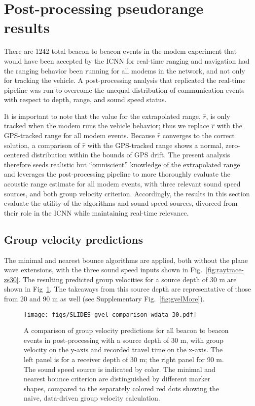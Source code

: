 \FloatBarrier
\section{\label{sec:postprocess} Post-processing pseudorange results}

There are 1242 total beacon to beacon events in the modem experiment that would have been accepted by the ICNN for real-time ranging and navigation had the ranging behavior been running for all modems in the network, and not only for tracking the vehicle.
A post-processing analysis that replicated the real-time pipeline was run to overcome the unequal distribution of communication events with respect to depth, range, and sound speed status.

It is important to note that the value for the extrapolated range, $\hat{r}$, is only tracked when the modem runs the vehicle behavior; thus we replace $\hat{r}$ with the GPS-tracked range for all modem events.
Because $\hat{r}$ converges to the correct solution, a comparison of $\hat{r}$ with the GPS-tracked range shows a normal, zero-centered distribution within the bounds of GPS drift.
The present analysis therefore seeds realistic but ``omniscient'' knowledge of the extrapolated range and leverages the post-processing pipeline to more thoroughly evaluate the acoustic range estimate for all modem events, with three relevant sound speed sources, and both group velocity criterion.
Accordingly, the results in this section evaluate the utility of the algorithms and sound speed sources, divorced from their role in the ICNN while maintaining real-time relevance.

\FloatBarrier
\subsection{Group velocity predictions}

The minimal and nearest bounce algorithms are applied, both without the plane wave extensions, with the three sound speed inputs shown in Fig.~\ref{fig:raytrace-zs30}.
The resulting predicted group velocities for a source depth of 30 m are shown in Fig~\ref{fig:gvel30}.
The takeaways from this source depth are representative of those from 20 and 90 m as well (see Supplementary Fig.~\ref{fig:gvelMore}).

\begin{figure}[h!]
\texttt{[image: figs/SLIDES-gvel-comparison-wdata-30.pdf]}
\caption{A comparison of group velocity predictions for all beacon to beacon events in post-processing with a source depth of 30 m, with group velocity on the y-axis and recorded travel time on the x-axis. The left panel is for a receiver depth of 30 m; the right panel for 90 m. The sound speed source is indicated by color. The minimal and nearest bounce criterion are distinguished by different marker shapes, compared to the separately colored red dots showing the naive, data-driven group velocity calculation.}
\label{fig:gvel30}
\end{figure}

